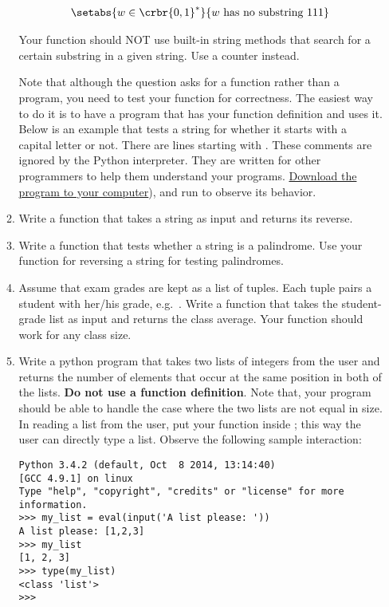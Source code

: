 \documentclass[a4paper]{article}
\begin{document}
\begin{itemize}
\begin{uexercise}
\begin{enumerate}
\begin{align*}
\setabs{w\in \crbr{0,1}^*}{w \text{ has no substring }111}
\end{align*}

Your function should NOT use built-in string methods that search for a certain
substring in a given string. Use a counter instead.

Note that although the question asks for a function rather than a program, you
need to test your function for correctness. The easiest way to do it is to have
a program that has your function definition and uses it. Below is an example
that tests a string for whether it starts with a capital letter or not. There
are lines starting with \pyv{#}. These comments are ignored by the Python
interpreter. They are written for other programmers to help them understand your
programs.
\href{https://www.dropbox.com/s/10wiiqy6a0g2hp9/func-prog-ex.py?dl=0}{Download
the program to your computer}), and run to observe its behavior.

\begin{ucodeframe}
\footnotesize
{}
\end{ucodeframe}

\item Write a function that takes a string as input and returns its reverse. 
\item Write a function that tests whether a string is a palindrome. Use your
function for reversing a string for testing palindromes. 

\item Assume that exam grades are kept as a list of tuples. Each tuple pairs
a student with her/his grade, e.g.\ .
Write a function that takes the student-grade list as input and returns the
class average. Your function should work for any class size.


\item Write a python program that takes two lists of integers from the user
and returns the number of elements that occur at the same position in both of
the lists. {\bf Do not use a function definition}. Note that, your program
should be able to handle the case where the two lists are not equal in size. 
In reading a list from the user, put your  function inside
; this way the user can directly type a list. Observe the following
sample interaction:


\begin{ucodeframe}
\footnotesize
\begin{Verbatim}
Python 3.4.2 (default, Oct  8 2014, 13:14:40) 
[GCC 4.9.1] on linux
Type "help", "copyright", "credits" or "license" for more information.
>>> my_list = eval(input('A list please: '))
A list please: [1,2,3]
>>> my_list
[1, 2, 3]
>>> type(my_list)
<class 'list'>
>>> 
\end{Verbatim}
\end{ucodeframe}



\end{enumerate}
\end{uexercise}
\end{itemize}
\end{document}
